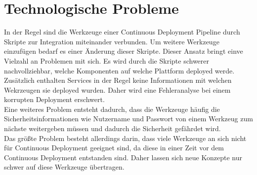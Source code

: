 \section{Technologische Probleme}
In der Regel sind die Werkzeuge einer Continuous Deployment Pipeline durch Skripte zur Integration miteinander verbunden. Um weitere Werkzeuge einzufügen bedarf es einer Änderung dieser Skripte. Dieser Ansatz bringt einve Vielzahl an Problemen mit sich. Es wird durch die Skripte schwerer nachvollziehbar, welche Komponenten auf welche Plattform deployed werde. Zusätzlich enthalten Services in der Regel keine Informationen mit welchen Wekrzeugen sie deployed wurden. Daher wird eine Fehleranalyse bei einem korrupten Deployment erschwert.\\
Eine weiteres Problem entsteht dadurch, dass die Werkzeuge häufig die Sicherheitsinformationen wie Nutzername und Passwort von einem Werkzeug zum nächste weitergeben müssen und dadurch die Sicherheit gefährdet wird. \\
Das größte Problem besteht allerdings darin, dass viele Werkzeuge an sich nicht für Continuous Deployment geeignet sind, da diese in einer Zeit vor dem Continuous Deployment entstanden sind. Daher lassen sich neue Konzepte nur schwer auf diese Werkzeuge übertragen.